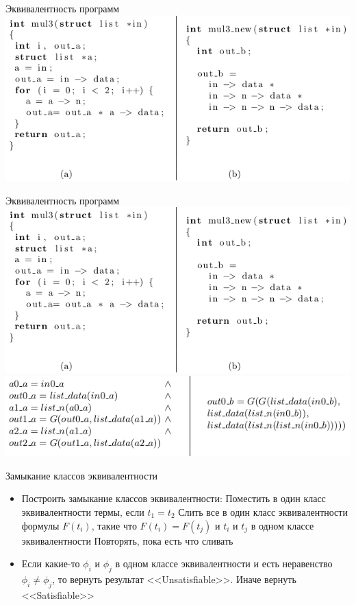 \documentclass{beamer}
\begin{document}
\begin{frame}{Эквивалентность программ}
\includegraphics[scale=0.5]{mul3.png}
\end{frame}

\begin{frame}{Эквивалентность программ}
\includegraphics[scale=0.5]{mul3.png}
\includegraphics[scale=0.5]{mul3_ans.png}
\end{frame}

\begin{frame}{Замыкание классов эквивалентности}
\begin{itemize}
\item Построить замыкание классов эквивалентности:\newline
Поместить в один класс эквивалентности термы, если $t_1 = t_2$\newline
Слить все в один класс эквивалентности формулы $F(t_i)$, такие что $F(t_i) = F(t_j)$ и $t_i$ и $t_j$ в одном классе
эквивалентности\newline
Повторять, пока есть что сливать
\item Если какие-то $\phi_i$ и $\phi_j$ в одном классе эквивалентности и есть неравенство $\phi_i \neq \phi_j$, то вернуть результат
<<Unsatisfiable>>. Иначе вернуть <<Satisfiable>>
\end{itemize}
\end{frame}
\end{document}
